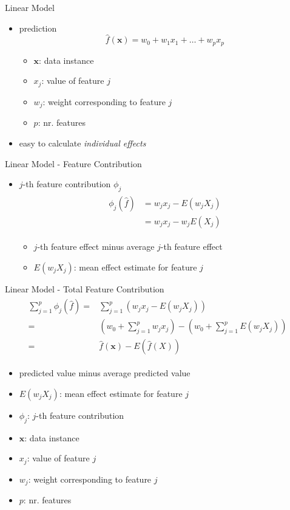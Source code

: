 \begin{frame}{Linear Model}
	\begin{itemize}
		\item prediction
		\begin{equation}
			\hat{f}(\bm{x})=w_0+w_1 x_{1} + \dots + w_p x_ p
		\end{equation}
		\begin{itemize}
			\item $\bm{x}$: data instance
			\item $x_j$: value of feature $j$
			\item $w_j$: weight corresponding to feature $j$
			\item $p$: nr. features
		\end{itemize}
		\item easy to calculate \emph{individual effects}
	\end{itemize}
\end{frame}
\begin{frame}{Linear Model - Feature Contribution}
	\begin{itemize}
		\item $j$-th feature contribution $\phi_j$
		\begin{align}
			\begin{split}
				\phi_j(\hat{f})
				&=w_{j}x_j-E(w_{j}X_{j})\\
				&=w_{j}x_j-w_{j}E(X_{j})
			\end{split}
		\end{align}
		\begin{itemize}
			\item $j$-th feature effect minus average $j$-th feature effect
			\item $E(w_{j}X_{j})$: mean effect estimate for feature $j$
		\end{itemize}
	\end{itemize}
\end{frame}
\begin{frame}{Linear Model - Total Feature Contribution}
	\begin{align}
		\begin{split}
			\sum_{j=1}^{p}\phi_j(\hat{f}) =&\sum_{j=1}^p(w_{j}x_j-E(w_{j}X_{j}))\\
			=&(w_0+\sum_{j=1}^pw_{j}x_j)-(w_0+\sum_{j=1}^{p}E(w_{j}X_{j}))\\
			=&\hat{f}(\bm{x})-E(\hat{f}(X))
		\end{split}
	\end{align}
	\begin{itemize}
		\item predicted value minus average predicted value
		\item $E(w_{j}X_{j})$: mean effect estimate for feature $j$
		\item $\phi_j$: $j$-th feature contribution
		\item $\bm{x}$: data instance
		\item $x_j$: value of feature $j$
		\item $w_j$: weight corresponding to feature $j$
		\item $p$: nr. features
	\end{itemize}
\end{frame}